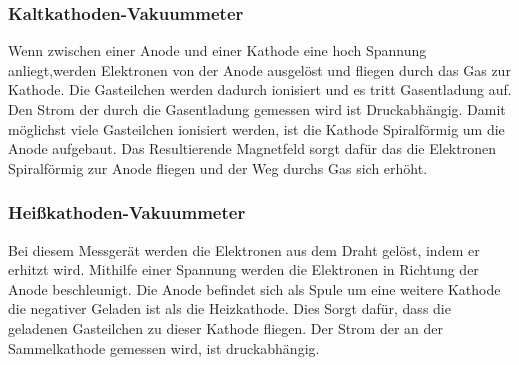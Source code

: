 \subsubsection{Kaltkathoden-Vakuummeter}
Wenn zwischen einer Anode und einer Kathode eine hoch Spannung anliegt,werden Elektronen von der Anode ausgelöst und fliegen durch das Gas zur Kathode. Die Gasteilchen werden dadurch ionisiert und es tritt Gasentladung auf. Den Strom der durch die Gasentladung gemessen wird ist Druckabhängig. Damit möglichst viele Gasteilchen ionisiert werden, ist die Kathode Spiralförmig um die Anode aufgebaut. Das Resultierende Magnetfeld sorgt dafür das die Elektronen Spiralförmig zur Anode fliegen und der Weg durchs Gas sich erhöht.
\subsubsection{Heißkathoden-Vakuummeter}
Bei diesem Messgerät werden die Elektronen aus dem Draht gelöst, indem er erhitzt wird. Mithilfe einer Spannung werden die Elektronen in Richtung der Anode beschleunigt. Die Anode befindet sich als Spule um eine weitere Kathode die negativer Geladen ist als die Heizkathode. Dies Sorgt dafür, dass die geladenen Gasteilchen zu dieser Kathode fliegen. Der Strom der an der Sammelkathode gemessen wird, ist druckabhängig.